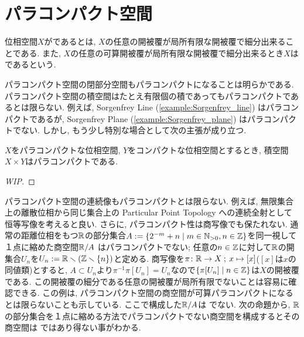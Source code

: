 \documentclass[uplatex, dvipdfmx, a4paper, 12pt, class=jsbook, crop=false]{standalone}
\begin{document}
\section{パラコンパクト空間}
\label{sec:paracompact-spaces}

\newcommand{\starset}[2]{\mathrm{St}\left(#1 , \: #2\right)}
\newcommand{\sstarset}[3]{\mathrm{St}^{#1}\left(#2 , \: #3 \right)}

\begin{definition}
	位相空間$ X $がであるとは, $ X $の任意の開被覆が局所有限な開被覆で細分出来ることである. また, $ X $の任意の可算開被覆が局所有限な開被覆で細分出来るとき$ X $はであるという.
\end{definition}

パラコンパクト空間の閉部分空間もパラコンパクトになることは明らかである. パラコンパクト空間の積空間はたとえ有限個の積であってもパラコンパクトであるとは限らない. 例えば, Sorgenfrey Line (\ref{example:Sorgenfrey_line}) はパラコンパクトであるが, Sorgenfrey Plane (\ref{example:Sorgenfrey_plane}) はパラコンパクトでない. しかし, もう少し特別な場合として次の主張が成り立つ.

\begin{proposition}
	$ X $をパラコンパクトな位相空間, $ Y $をコンパクトな位相空間とするとき, 積空間$ X \times Y $はパラコンパクトである.
\end{proposition}
\begin{proof}
	[WIP]
\end{proof}

パラコンパクト空間の連続像もパラコンパクトとは限らない. 例えば, 無限集合上の離散位相から同じ集合上の Particular Point Topology への連続全射として恒等写像を考えると良い. さらに, パラコンパクト性は商写像でも保たれない. 通常の距離位相をもつ$ \mathbb{R} $の部分集合$ A \defeq \setcomp{2^{-m}+n}{m \in \N_{>0}, n \in \Z} $を同一視して１点に縮めた商空間$ \mathbb{R} / A $ はパラコンパクトでない; 任意の$ n \in \mathbb{Z} $に対して$ \mathbb{R} $の開集合$ U_n $を$ U_n \mathrel{:=} \mathbb{R} \smallsetminus (\mathbb{Z} \smallsetminus \{n\}) $と定める. 商写像を$ \pi \colon \mathbb{R} \to X \mathpunct{\: ; \:} x \mapsto [x] $($ [x] $は$ x $の同値類)とすると, $ A \subset U_n $より$ \pi^{-1}\pi[U_n] = U_n $なので$ \setcomp{\pi[U_n]}{n \in \Z} $は$ X $の開被覆である. この開被覆の細分である任意の開被覆が局所有限でないことは容易に確認できる. この例は, パラコンパクト空間の商空間が可算パラコンパクトになるとは限らないことも示している. ここで構成した$ \mathbb{R} / A $は  でない. 次の命題から, $ \mathbb{R} $の部分集合を１点に縮める方法でパラコンパクトでない商空間を構成するとその商空間は  ではあり得ない事がわかる.
\end{document}
